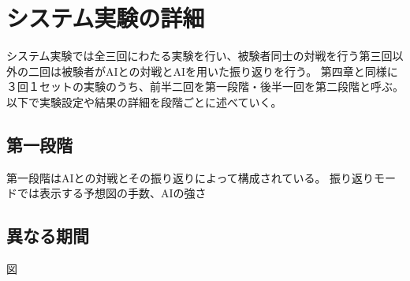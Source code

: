 \chapter{システム実験の詳細}
システム実験では全三回にわたる実験を行い、被験者同士の対戦を行う第三回以外の二回は被験者がAIとの対戦とAIを用いた振り返りを行う。
第四章と同様に３回１セットの実験のうち、前半二回を第一段階・後半一回を第二段階と呼ぶ。
以下で実験設定や結果の詳細を段階ごとに述べていく。
\section{第一段階}
第一段階はAIとの対戦とその振り返りによって構成されている。
振り返りモードでは表示する予想図の手数、AIの強さ
\section{異なる期間}

図